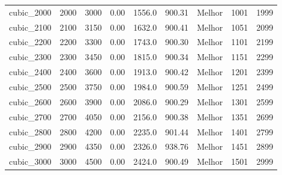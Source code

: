 \begin{table}[h!]
{\begin{tabular}{lllllllll}
			cubic\_2000 & 2000 & 3000 & 0.00 & 1556.0 & 900.31 & Melhor & 1001 & 1999 \\
			cubic\_2100 & 2100 & 3150 & 0.00 & 1632.0 & 900.41 & Melhor & 1051 & 2099 \\
			cubic\_2200 & 2200 & 3300 & 0.00 & 1743.0 & 900.30 & Melhor & 1101 & 2199 \\
			cubic\_2300 & 2300 & 3450 & 0.00 & 1815.0 & 900.34 & Melhor & 1151 & 2299 \\
			cubic\_2400 & 2400 & 3600 & 0.00 & 1913.0 & 900.42 & Melhor & 1201 & 2399 \\
			cubic\_2500 & 2500 & 3750 & 0.00 & 1984.0 & 900.59 & Melhor & 1251 & 2499 \\
			cubic\_2600 & 2600 & 3900 & 0.00 & 2086.0 & 900.29 & Melhor & 1301 & 2599 \\
			cubic\_2700 & 2700 & 4050 & 0.00 & 2156.0 & 900.38 & Melhor & 1351 & 2699 \\
			cubic\_2800 & 2800 & 4200 & 0.00 & 2235.0 & 901.44 & Melhor & 1401 & 2799 \\
			cubic\_2900 & 2900 & 4350 & 0.00 & 2326.0 & 938.76 & Melhor & 1451 & 2899 \\
			cubic\_3000 & 3000 & 4500 & 0.00 & 2424.0 & 900.49 & Melhor & 1501 & 2999 \\
			\bottomrule
		\end{tabular}
	}{
}
\end{table}